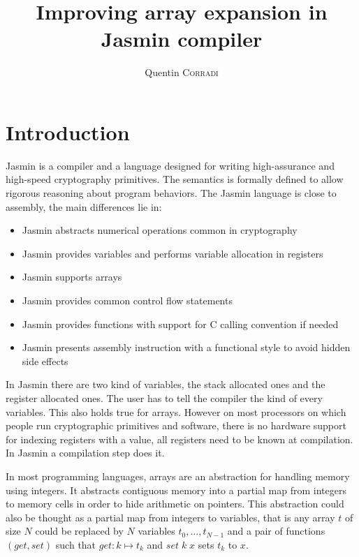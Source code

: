 \documentclass{article}
\title{Improving array expansion in Jasmin compiler}
\author{Quentin \textsc{Corradi}}
\begin{document}
\maketitle

\section{Introduction}

Jasmin\cite{10.1145/3133956.3134078, 10.1145/3319535.3363211, 9152665} is a
compiler and a language designed for writing high-assurance and
high-speed cryptography primitives. The semantics is formally defined to allow
rigorous reasoning about program behaviors.
The Jasmin language is close to assembly, the main differences lie in:
\begin{itemize}
\item Jasmin abstracts numerical operations common in cryptography
\item Jasmin provides variables and performs variable allocation in registers
\item Jasmin supports arrays
\item Jasmin provides common control flow statements
\item Jasmin provides functions with support for C calling convention if needed
\item Jasmin presents assembly instruction with a functional style to avoid
hidden side effects
\end{itemize}

In Jasmin there are two kind of variables, the stack allocated ones and the
register allocated ones. The user has to tell the compiler the kind of every
variables. This also holds true for arrays. However on most processors on which
people run cryptographic primitives and software, there is no hardware support
for indexing registers with a value, all registers need to be known at
compilation. In Jasmin a compilation step does it.

\medskip

In most programming languages, arrays are an abstraction for handling memory
using integers. It abstracts contiguous memory into a partial map from integers
to memory cells in order to hide arithmetic on pointers. This abstraction could
also be thought as a partial map from integers to variables, that is any array
\(t\) of size \(N\) could be replaced by \(N\) variables
\(t_0, \dots, t_{N - 1}\) and a pair of functions
\((\mathit{get}, \mathit{set})\) such that \(\mathit{get} : k \mapsto t_k\) and
\(\mathit{set}\;k\;x\) sets \(t_k\) to \(x\).
\end{document}

